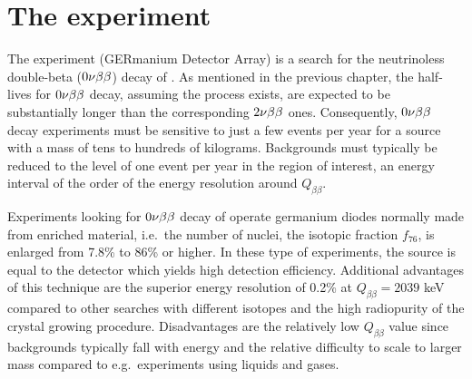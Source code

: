\chapter{The {\gerda} experiment}
The {\gerda} experiment (GERmanium Detector Array) is a search for the neutrinoless double-beta ($0\nu\beta\beta$) decay of . As mentioned in the previous chapter, the half-lives for $0\nu\beta\beta$ decay, assuming the process exists, are expected to be substantially longer than the corresponding $2\nu\beta\beta$ ones. Consequently, $0\nu\beta\beta$ decay experiments must be sensitive to just a few events per year for a source with a mass of tens to hundreds of kilograms. Backgrounds must typically be reduced to the level of one event per year in the region of interest, an energy interval of the order of the energy resolution around $Q_{\beta\beta}$. 

Experiments looking for $0\nu\beta\beta$ decay of  operate germanium diodes normally made from enriched material, i.e.~the number of  nuclei, the isotopic fraction $f_{76}$, is enlarged from 7.8\% to 86\% or higher. In these type of experiments, the source is equal to the detector which yields high detection efficiency. Additional advantages of this technique are the superior energy resolution of 0.2\% at $Q_{\beta\beta}=2039$ keV compared to other searches with different isotopes and the high radiopurity of the crystal growing procedure. Disadvantages are the relatively low $Q_{\beta\beta}$ value since backgrounds typically fall with energy and the relative difficulty to scale to larger mass compared to e.g.~experiments using liquids and gases.

